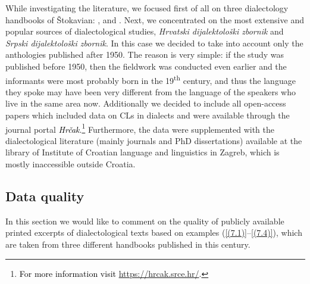 While investigating the literature, we focused first of all on three dialectology handbooks of Štokavian: \citet{IPR01}, \citet{Lisac03} and \citet{Okuka08}. Next, we concentrated on the most extensive and popular sources of dialectological studies, \textit{Hrvatski dijalektološki zbornik} and \textit{Srpski dijalektološki zbornik}. In this case we decided to take into account only the anthologies published after 1950. The reason is very simple: if the study was published before 1950, then the fieldwork was conducted even earlier and the informants were most probably born in the 19\textsuperscript{th} century, and thus the language they spoke may have been very different from the language of the speakers who live in the same area now. Additionally we decided to include all open-access papers which included data on CLs in dialects and were available through the journal portal \textcolor{black}{\textit{Hrčak}}.\footnote{\textcolor{black}{For more information visit} \url{https://hrcak.srce.hr/}.} Furthermore, the data were supplemented with the dialectological literature (mainly journals and PhD dissertations) available at the library of Institute of Croatian language and linguistics in Zagreb, which is mostly inaccessible outside Croatia.  

\subsection{Data quality}

In this section we would like to comment on the quality of publicly available printed excerpts of dialectological texts based on examples (\ref{(7.1)}--\ref{(7.4)}), which are taken from three different handbooks published in this century.
 
